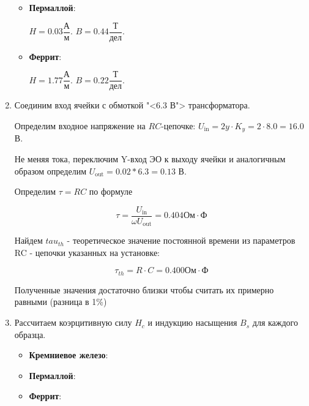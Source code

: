 \documentclass[12pt]{lab}
\begin{document}
\begin{enumerate}
\begin{itemize}
            \item  \textbf{Пермаллой}:

                $H=0.03 \dfrac{\text{А}}{\text{м}}.$
                $B=0.44 \dfrac{\text{Т}}{\text{дел}}.$

            \item  \textbf{Феррит}:

                $H=1.77 \dfrac{\text{А}}{\text{м}}.$
                $B=0.22 \dfrac{\text{Т}}{\text{дел}}.$

        \end{itemize}

    \item Соединим вход ячейки с обмоткой "<6.3 В"> трансформатора.

        Определим входное напряжение на $ RC $-цепочке:
        $U_\text{in}=2y\cdot K_{y} = 2 \cdot 8.0 = 16.0$ В.

        Не меняя тока, переключим Y-вход ЭО к выходу ячейки и
        аналогичным образом определим $U_\text{out} = 0.02 * 6.3 = 0.13$ В.

        Определим $\tau = RC $ по формуле

        $$\tau = \dfrac{U_\text{in}}{\omega U_\text{out}} = 0.404 \text{Ом} \cdot \text{Ф}$$

        Найдем $tau_{th}$ - теоретическое значение постоянной времени из параметров RC - цепочки указанных на установке:

        $$\tau_{th} = R \cdot C = 0.400 \text{Ом} \cdot \text{Ф}$$

        Полученные значения достаточно близки чтобы считать их примерно равными (разница в 1\%)

    \item Рассчитаем коэрцитивную силу $H_{c}$ и индукцию насыщения
        $B_{s}$ для каждого образца.

        \begin{itemize}
            \item   \textbf{Кремниевое железо}:


            \item  \textbf{Пермаллой}:


            \item  \textbf{Феррит}:


\end{itemize}
\end{enumerate}
\end{document}
